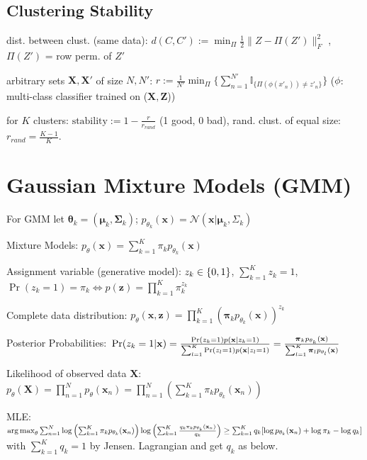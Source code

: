\documentclass[a4paper, 11pt, landscape]{article}
\DeclareMathOperator*{\argmax}{arg\,max}
\begin{document}
\begin{multicols*}{3}
\subsection{Clustering Stability}
\begin{inparaitem}[\color{red}\textbullet]
  \item dist. between clust. (same data): $d(C,C') := \min_\Pi \frac{1}{2}\|Z-\Pi(Z')\|^2_F$ , $\Pi(Z
')$ = row perm. of $Z'$
  \item arbitrary sets $\mathbf{X},\mathbf{X'}$ of size $N,N'$: $r := \frac{1}{N'} \min_{\Pi} \{ \sum_{n=1}^{N'} \mathbb{I}_{\{\Pi(\phi(x'_n)) \neq z'_n\} } \}$ ($\phi$: multi-class classifier trained on ($\mathbf{X},\mathbf{Z}$))
  \item for $K$ clusters: $\text{stability} := 1 - \frac{r}{r_{rand}}$ (1 good, 0 bad), rand. clust. of equal size: $r_{rand} = \frac{K-1}{K}$.
\end{inparaitem}

\section{Gaussian Mixture Models (GMM)}
For GMM let $\boldsymbol{\theta}_k = (\boldsymbol{\mu}_k, \boldsymbol{\Sigma}_k)$; $p_{\theta_k}(\mathbf{x}) = \mathcal{N}(\mathbf{x} | \boldsymbol{\mu}_k, \Sigma_k)$
\begin{compactdesc}
	\item[Mixture Models:] $p_\theta(\mathbf{x}) = \sum_{k=1}^K \pi_k p_{\theta_k}(\mathbf{x})$
	\item[Assignment variable (generative model):] $\\z_k \in \{0, 1\}$, $\sum_{k=1}^K z_k = 1$, $\operatorname{Pr}(z_k = 1) = \pi_k \Leftrightarrow p(\mathbf{z}) = \prod_{k=1}^K \pi_k^{z_k}$
	\item[Complete data distribution:] $p_\theta(\mathbf{x}, \mathbf{z}) = \prod_{k=1}^K \left( \boldsymbol{\pi}_k p_{\theta_k}(\mathbf{x})\right)^{z_k}$
	\item[Posterior Probabilities:] $\\\operatorname{Pr}(z_k = 1 | \mathbf{x}) = \frac{\operatorname{Pr}(z_k = 1) p(\mathbf{x} | z_k = 1)}{\sum_{l=1}^K \operatorname{Pr}(z_l = 1) p(\mathbf{x} | z_l = 1)} = \frac{\boldsymbol{\pi}_k p_{\theta_k}(\mathbf{x})}{\sum_{l=1}^K \boldsymbol{\pi}_l p_{\theta_l}(\mathbf{x})}$
	\item[Likelihood of observed data $\mathbf{X}$:] $p_\theta(\mathbf{X}) = \prod_{n=1}^N p_\theta(\mathbf{x}_n) = \prod_{n=1}^N \left(\sum_{k=1}^K \pi_k p_{\theta_k}(\mathbf{x}_n)\right)$
	\item[MLE:] $\argmax_\theta\sum_{n=1}^N \log \left( \sum_{k=1}^K \pi_k p_{\theta_k}(\mathbf{x}_n)\right) \break \log \left( \sum_{k=1}^K{\frac{q_k \pi_k p_{\theta_k}(\mathbf{x}_n)}{q_k}}\right) \ge \sum_{k=1}^K{q_k[\log p_{\theta_k}(\mathbf{x}_n) + \log \pi_k - \log q_k]}$ with $\sum_{k=1}^K{q_k} = 1$ by Jensen. Lagrangian and get $q_k$ as below.
\end{compactdesc}


\end{multicols*}
\end{document}
